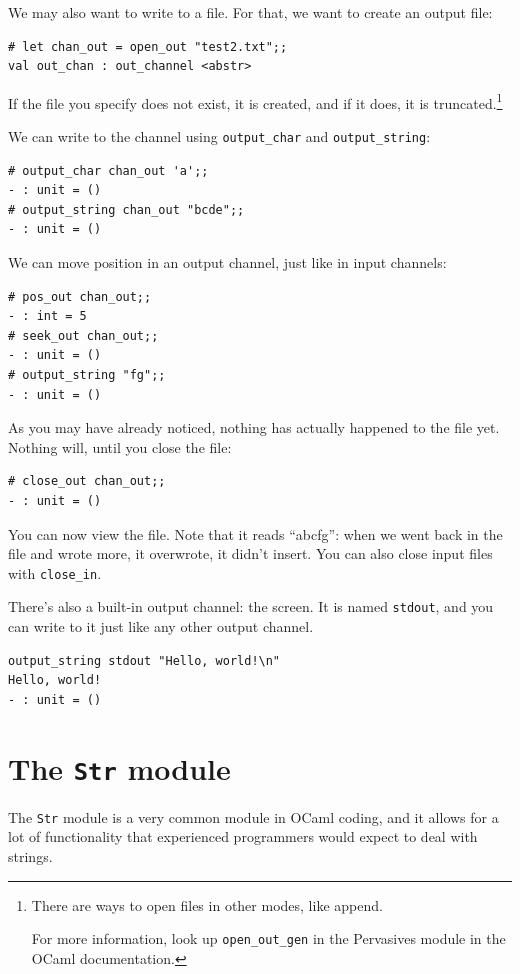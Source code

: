 \documentclass[10pt]{book}
\begin{document}
{We may also want to write to a file. For that, we want to create an output file:

\beforeverb
\begin{verbatim}
# let chan_out = open_out "test2.txt";;
val out_chan : out_channel <abstr>
\end{verbatim}
\afterverb

If the file you specify does not exist, it is created, and if it does,
it is truncated.\footnote{There are ways to open files in other modes,
  like append. 

For more information, look up {\tt open\_out\_gen} in the
  Pervasives module in the OCaml documentation.}

We can write to the
channel using \verb"output_char" and \verb"output_string": \beforeverb

\begin{verbatim}
# output_char chan_out 'a';;
- : unit = ()
# output_string chan_out "bcde";;
- : unit = ()
\end{verbatim}
\afterverb

We can move position in an output channel, just like in input channels:
\beforeverb
\begin{verbatim}
# pos_out chan_out;;
- : int = 5
# seek_out chan_out;;
- : unit = ()
# output_string "fg";;
- : unit = ()
\end{verbatim}
\afterverb

As you may have already noticed, nothing has actually happened to the file yet. Nothing will, until you close the file:
\beforeverb
\begin{verbatim}
# close_out chan_out;;
- : unit = ()
\end{verbatim}
\afterverb
You can now view the file. Note that it reads ``abcfg'': when we went back in the file and wrote more, it overwrote, it didn't insert. You can also close input files with \verb"close_in".

There's also a built-in output channel: the screen. It is named {\tt stdout}, and you can write to it just like any other output channel.
\beforeverb
\begin{verbatim}
output_string stdout "Hello, world!\n"
Hello, world!
- : unit = ()
\end{verbatim}
\afterverb

\section{The {\tt Str} module}

The {\tt Str} module is a very common module in OCaml coding, and it allows for a lot of functionality that experienced programmers would expect to deal with strings.

}
\end{document}
